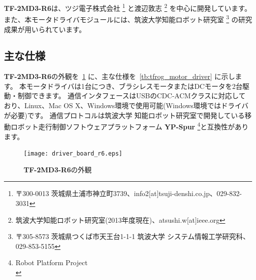 \documentclass[11pt,a4j,openany,fleqn]{jbook}
\begin{document}
{\bf TF-2MD3-R6}は、ツジ電子株式会社
\footnote{ 〒300-0013 茨城県土浦市神立町3739、info2[at]tsuji-denshi.co.jp、029-832-3031}
と渡辺敦志
\footnote{ 筑波大学知能ロボット研究室(2013年度現在)、atsushi.w[at]ieee.org}
を中心に開発しています。
また、本モータドライバモジュールには、筑波大学知能ロボット研究室
\footnote{ 〒305-8573 茨城県つくば市天王台1-1-1 筑波大学 システム情報工学研究科、029-853-5155}
の研究成果が用いられています。\par


\newpage
\subsection{主な仕様}
\label{sec:主な仕様}

{\bf TF-2MD3-R6}の外観を\figurename~\ref{fig:driver_board_r6} に、主な仕様を\tablename~\ref{tb:tfrog_motor_driver} に示します。
本モータドライバは1台につき、ブラシレスモータまたはDCモータを2台駆動・制御できます。
通信インタフェースはUSBのCDC-ACMクラスに対応しており、Linux、Mac OS X、Windows環境で使用可能(Windows環境ではドライバが必要)です。
通信プロトコルは筑波大学 知能ロボット研究室で開発している移動ロボット走行制御ソフトウェアプラットフォーム {\bf YP-Spur} \footnote{Robot Platform Project \\ }と互換性があります。\par

\begin{figure}[H]
\centering\texttt{[image: driver\_board\_r6.eps]}
\caption{{\bf TF-2MD3-R6}の外観}
\label{fig:driver_board_r6}
\end{figure}
\end{document}
